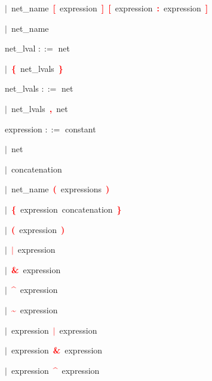 \mbox{$|$ net\_name \textbf{\textcolor{red}{[}} expression \textbf{\textcolor{red}{]}} \textbf{\textcolor{red}{[}} expression \textbf{\textcolor{red}{:}} expression \textbf{\textcolor{red}{]}}}

\mbox{$|$ net\_name}

\vspace{1em}
\noindent
\settowidth{\parindent}{\hspace{4ex}}
net\_lval $::=$\hspace{1ex} net

\mbox{$|$ \textbf{\textcolor{red}{\textbf{\textcolor{red}{\{}}}} net\_lvals \textbf{\textcolor{red}{\textbf{\textcolor{red}{\}}}}}}

\vspace{1em}
\noindent
\settowidth{\parindent}{\hspace{4ex}}
net\_lvals $::=$\hspace{1ex} net

\mbox{$|$ net\_lvals \textbf{\textcolor{red}{,}} net}

\vspace{1em}
\noindent
\settowidth{\parindent}{\hspace{4ex}}
expression $::=$\hspace{1ex} constant

\mbox{$|$ net}

\mbox{$|$ concatenation}

\mbox{$|$ net\_name \textbf{\textcolor{red}{(}} expressions \textbf{\textcolor{red}{)}}}

\mbox{$|$ \textbf{\textcolor{red}{\textbf{\textcolor{red}{\{}}}} expression concatenation \textbf{\textcolor{red}{\textbf{\textcolor{red}{\}}}}}}

\mbox{$|$ \textbf{\textcolor{red}{(}} expression \textbf{\textcolor{red}{)}}}

\mbox{$|$ \textbf{\textcolor{red}{$|$}} expression}

\mbox{$|$ \textbf{\textcolor{red}{\textbf{\textcolor{red}{\&}}}} expression}

\mbox{$|$ \textbf{\textcolor{red}{\^{}}} expression}

\mbox{$|$ \textbf{\textcolor{red}{\~{}}} expression}

\mbox{$|$ expression \textbf{\textcolor{red}{$|$}} expression}

\mbox{$|$ expression \textbf{\textcolor{red}{\textbf{\textcolor{red}{\&}}}} expression}

\mbox{$|$ expression \textbf{\textcolor{red}{\^{}}} expression}

